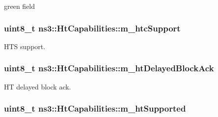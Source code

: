 green field 

\subsubsection[{\texorpdfstring{m\+\_\+htc\+Support}{m_htcSupport}}]{\setlength{\rightskip}{0pt plus 5cm}uint8\+\_\+t ns3\+::\+Ht\+Capabilities\+::m\+\_\+htc\+Support\hspace{0.3cm}{\ttfamily [private]}}\hypertarget{classns3_1_1HtCapabilities_a05ab5b1b8e8d752ec98e0cfec431f19b}{}\label{classns3_1_1HtCapabilities_a05ab5b1b8e8d752ec98e0cfec431f19b}


H\+TS support. 

\subsubsection[{\texorpdfstring{m\+\_\+ht\+Delayed\+Block\+Ack}{m_htDelayedBlockAck}}]{\setlength{\rightskip}{0pt plus 5cm}uint8\+\_\+t ns3\+::\+Ht\+Capabilities\+::m\+\_\+ht\+Delayed\+Block\+Ack\hspace{0.3cm}{\ttfamily [private]}}\hypertarget{classns3_1_1HtCapabilities_a639f078faf090e289af27bdf9a127eba}{}\label{classns3_1_1HtCapabilities_a639f078faf090e289af27bdf9a127eba}


HT delayed block ack. 

\subsubsection[{\texorpdfstring{m\+\_\+ht\+Supported}{m_htSupported}}]{\setlength{\rightskip}{0pt plus 5cm}uint8\+\_\+t ns3\+::\+Ht\+Capabilities\+::m\+\_\+ht\+Supported\hspace{0.3cm}{\ttfamily [private]}}\hypertarget{classns3_1_1HtCapabilities_ac513840270788d2b42800e8ed32f74b9}{}\label{classns3_1_1HtCapabilities_ac513840270788d2b42800e8ed32f74b9}


